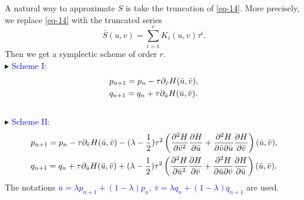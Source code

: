 \documentclass[10pt]{beamer}
\begin{document}
\begin{frame}
A natural way to approximate $S$ is take the truncation of \eqref{eq-14}. More precisely, we replace \eqref{eq-14} with the truncated series
\begin{equation}\label{eq-16}
\bar{S}(u,v)=\sum_{i=1}^{r} K_i(u,v)\tau^i.
\end{equation}
Then we get a symplectic scheme of order $r$.\\
\vspace{2mm}
\textcolor[rgb]{0,0,1}{$\blacktriangleright$} \textcolor{blue}{Scheme I:}
\begin{align}\label{eq-17}
\aligned
&p_{n+1}=p_n-\tau\partial_{\bar{v}}H(\bar{u},\bar{v}),\\
&q_{n+1}=q_n+\tau\partial_{\bar{u}}H(\bar{u},\bar{v}).\\
\endaligned
\end{align}\\

\textcolor[rgb]{0,0,1}{$\blacktriangleright$} \textcolor{blue}{Scheme II:}
\begin{align}\label{eq-18}
\aligned
&p_{n+1}=p_n-\tau\partial_{\bar{v}}H(\bar{u},\bar{v})-(\lambda-\frac{1}{2})\tau^2\left(\frac{\partial^2H}{\partial {\bar{v}}^2}\frac{\partial H}{\partial {\bar{u}}}+\frac{\partial^2H}{\partial {\bar{v}}\partial {\bar{u}}}\frac{\partial H}{\partial {\bar{v}}}\right)(\bar{u},\bar{v}),\\
&q_{n+1}=q_n+\tau\partial_{\bar{u}}H(\bar{u},\bar{v})+(\lambda-\frac{1}{2})\tau^2\left(\frac{\partial^2H}{\partial {\bar{u}}^2}\frac{\partial H}{\partial {\bar{v}}}+\frac{\partial^2H}{\partial {\bar{u}}\partial {\bar{v}}}\frac{\partial H}{\partial {\bar{u}}}\right)(\bar{u},\bar{v}).\\
\endaligned
\end{align}
The notations \textcolor{blue}{$\bar{u} = \lambda p_{n+1}+(1-\lambda)p_n,\ \bar{v} = \lambda q_n+(1-\lambda)q_{n+1}$} are used.
\end{frame}
\end{document}
